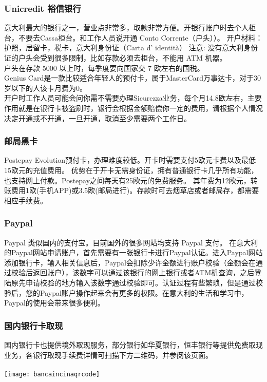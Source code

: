 \subsubsection{Unicredit 裕信银行}
意大利最大的银行之一，营业点非常多，取款非常方便。开银行账户时去个人柜台，不要去Cassa柜台。和工作人员说开通 Conto Corrente（户头））。
开户材料：护照，居留卡，税卡，意大利身份证（Carta d’ identità）
注意:
没有意大利身份证的户头会受到很多限制，比如存款必须去柜台，不能用 ATM 机器。\\
户头在存款 5000 以上时，每季度要向国家交 7 欧左右的国税。\\
Genius Card是一款比较适合年轻人的预付卡，属于MasterCard万事达卡，对于30岁以下的人该卡月费为0。\\
开户时工作人员可能会问你需不需要办理Sicurezza业务，每个月14.8欧左右，主要作用就是在银行卡被盗刷时，银行会根据金额赔偿你一定的费用，请根据个人情况决定开通或不开通，一旦开通，取消至少需要两个工作日。 
\subsubsection{邮局黑卡}

Postepay Evolution预付卡，办理难度较低。开卡时需要支付5欧元卡费以及最低15欧元的充值费用。
优势在于开卡无需身份证，拥有普通银行卡几乎所有功能，也支持网上付款。Postepay之间每天有25欧元的免费服务。
其年费为12欧元，转账费用1欧(手机APP)或3.5欧(邮局进行)。存款时可去烟草店或者邮局存，都需要相应手续费。

\subsubsection{Paypal}

Paypal 类似国内的支付宝。目前国外的很多网站均支持 Paypal 支付。
在意大利的Paypal网站申请账户，首先需要有一张银行卡进行Paypal认证。进入Paypal网站添加银行卡，输入相关信息后，Paypal会扣除少许金额进行账户校验（金额会在通过校验后返回账户），该数字可以通过该银行的网上银行或者ATM机查询，之后登陆原先申请校验的地方输入该数字通过校验即可。认证过程有些繁琐，但是通过校验后，您的Paypal账户操作起来会有更多的权限。在意大利的生活和学习中，Paypal的使用会带来很多便利。

\subsubsection{国内银行卡取现}
国内银行卡也提供境外取现服务，部分银行如华夏银行，恒丰银行等提供免费取现业务，各银行取现手续费详情可扫描下方二维码，并参阅该页面。\\
\\
\texttt{[image: bancaincinaqrcode]}

